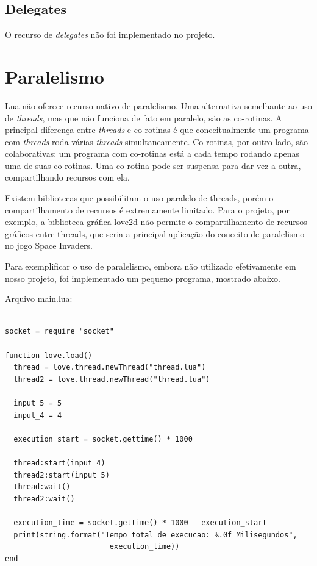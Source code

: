 \documentclass[rel_mlp]{iiufrgs}
\begin{document}
\section{Delegates}

O recurso de \textit{delegates} não foi implementado no projeto. 

\chapter{Paralelismo}

Lua não oferece recurso nativo de paralelismo. Uma alternativa semelhante ao uso de \textit{threads}, mas que não funciona de fato em paralelo, são as co-rotinas. A principal diferença entre \textit{threads} e co-rotinas é que conceitualmente um programa com \textit{threads} roda várias \textit{threads} simultaneamente. Co-rotinas, por outro lado, são colaborativas: um programa com co-rotinas está a cada tempo rodando apenas uma de suas co-rotinas. Uma co-rotina pode ser suspensa para dar vez a outra, compartilhando recursos com ela.

Existem bibliotecas que possibilitam o uso paralelo de threads, porém o compartilhamento de recursos é extremamente limitado. Para o projeto, por exemplo, a biblioteca gráfica love2d não permite o compartilhamento de recursos gráficos entre threads, que seria a principal aplicação do conceito de paralelismo no jogo Space Invaders.

Para exemplificar o uso de paralelismo, embora não utilizado efetivamente em nosso projeto, foi implementado um pequeno programa, mostrado abaixo.

Arquivo main.lua:

\begin{lstlisting}

socket = require "socket"

function love.load()
  thread = love.thread.newThread("thread.lua")
  thread2 = love.thread.newThread("thread.lua")

  input_5 = 5
  input_4 = 4

  execution_start = socket.gettime() * 1000

  thread:start(input_4)
  thread2:start(input_5)
  thread:wait()
  thread2:wait()

  execution_time = socket.gettime() * 1000 - execution_start
  print(string.format("Tempo total de execucao: %.0f Milisegundos",
                        execution_time))
end

\end{lstlisting}
\end{document}
